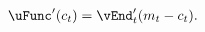   \begin{equation}\begin{gathered}\begin{aligned}
        \uFunc^{\prime}({c}_{t})   & = {\vEnd}_{t}^{\prime}({m}_{t}-{c}_{t}).
        \label{eq:upEqbetaOp}
      \end{aligned}\end{gathered}\end{equation}

